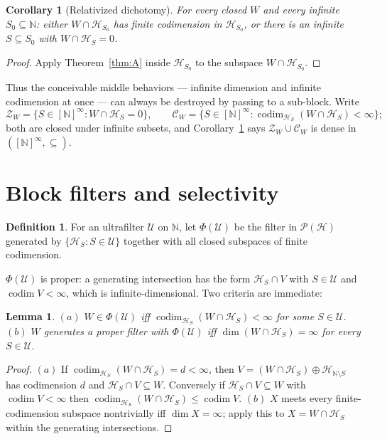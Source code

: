 \documentclass[11pt,reqno]{amsart}
\newtheorem{lemma}[theorem]{Lemma}
\newtheorem{corollary}[theorem]{Corollary}
\theoremstyle{definition}
\newtheorem{definition}[theorem]{Definition}
\newcommand{\HH}{\mathcal{H}}
\newcommand{\PP}{\mathcal{P}}
\newcommand{\N}{\mathbb{N}}
\newcommand{\U}{\mathcal{U}}
\newcommand{\ZW}{\mathcal{Z}}
\newcommand{\cod}{\operatorname{codim}}
\begin{document}
\begin{corollary}[Relativized dichotomy]\label{cor:B}
For every closed $W$ and every infinite $S_0\subseteq\N$: either $W\cap\HH_{S_0}$ has
finite codimension in $\HH_{S_0}$, or there is an infinite $S\subseteq S_0$ with
$W\cap\HH_S=0$.
\end{corollary}

\begin{proof}
Apply Theorem~\ref{thm:A} inside $\HH_{S_0}$ to the subspace $W\cap\HH_{S_0}$.
\end{proof}

Thus the conceivable middle behaviors --- infinite dimension and infinite codimension at
once --- can always be destroyed by passing to a sub-block. Write
\[
\ZW_W=\{S\in[\N]^\infty : W\cap\HH_S=0\},\qquad
\mathcal C_W=\{S\in[\N]^\infty : \cod_{\HH_S}(W\cap\HH_S)<\infty\};
\]
both are closed under infinite subsets, and Corollary~\ref{cor:B} says
$\ZW_W\cup\mathcal C_W$ is dense in $([\N]^\infty,\subseteq)$.

\section{Block filters and selectivity}\label{sec:block}

\begin{definition}
For an ultrafilter $\U$ on $\N$, let $\Phi(\U)$ be the filter in $\PP(\HH)$ generated by
$\{\HH_S:S\in\U\}$ together with all closed subspaces of finite codimension.
\end{definition}

$\Phi(\U)$ is proper: a generating intersection has the form $\HH_S\cap V$ with $S\in\U$
and $\cod V<\infty$, which is infinite-dimensional. Two criteria are immediate:

\begin{lemma}\label{lem:criteria}
$(a)$ $W\in\Phi(\U)$ iff $\cod_{\HH_S}(W\cap\HH_S)<\infty$ for some $S\in\U$.
$(b)$ $W$ generates a proper filter with $\Phi(\U)$ iff $\dim(W\cap\HH_S)=\infty$ for
every $S\in\U$.
\end{lemma}

\begin{proof}
$(a)$ If $\cod_{\HH_S}(W\cap\HH_S)=d<\infty$, then $V=(W\cap\HH_S)\oplus\HH_{\N\setminus
S}$ has codimension $d$ and $\HH_S\cap V\subseteq W$. Conversely if
$\HH_S\cap V\subseteq W$ with $\cod V<\infty$ then
$\cod_{\HH_S}(W\cap\HH_S)\le\cod V$. $(b)$ $X$ meets every finite-codimension subspace
nontrivially iff $\dim X=\infty$; apply this to $X=W\cap\HH_S$ within the generating
intersections.
\end{proof}
\end{document}
